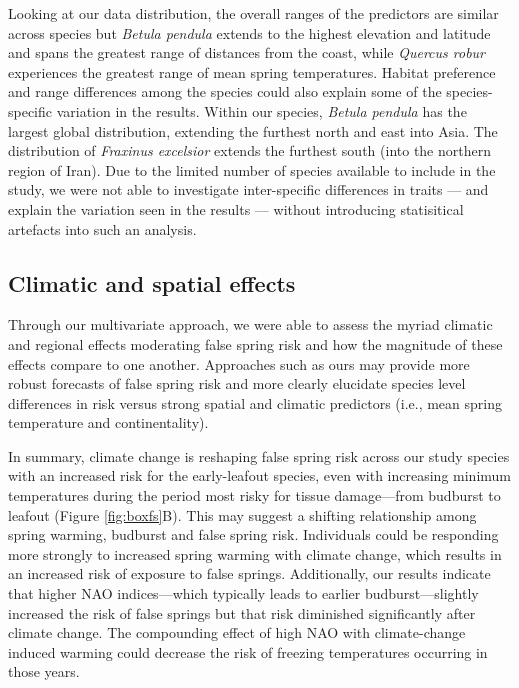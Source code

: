 \documentclass{article}\usepackage[]{graphicx}\usepackage[]{color}
\begin{document}
Looking at our data distribution, the overall ranges of the predictors are similar across species but \textit{Betula pendula} extends to the highest elevation and latitude and spans the greatest range of distances from the coast, while \textit{Quercus robur} experiences the greatest range of mean spring temperatures. Habitat preference and range differences among the species could also explain some of the species-specific variation in the results. Within our species, \textit{Betula pendula} has the largest global distribution, extending the furthest north and east into Asia. The distribution of \textit{Fraxinus excelsior} extends the furthest south (into the northern region of Iran). Due to the limited number of species available to include in the study, we were not able to investigate inter-specific differences in traits --- and explain the variation seen in the results --- without introducing statisitical artefacts into such an analysis.   
  
\subsection*{Climatic and spatial effects}
Through our multivariate approach, we were able to assess the myriad climatic and regional effects moderating false spring risk and how the magnitude of these effects compare to one another. Approaches such as ours may provide more robust forecasts of false spring risk and more clearly elucidate species level differences in risk versus strong spatial and climatic predictors (i.e., mean spring temperature and continentality). 

In summary, climate change is reshaping false spring risk across our study species with an increased risk for the early-leafout species, even with increasing minimum temperatures during the period most risky for tissue damage---from budburst to leafout (Figure \ref{fig:boxfs}B). This may suggest a shifting relationship among spring warming, budburst and false spring risk. Individuals could be responding more strongly to increased spring warming with climate change, which results in an increased risk of exposure to false springs. Additionally, our results indicate that higher NAO indices---which typically leads to earlier budburst---slightly increased the risk of false springs but that risk diminished significantly after climate change. The compounding effect of high NAO with climate-change induced warming could decrease the risk of freezing temperatures occurring in those years.
\end{document}
